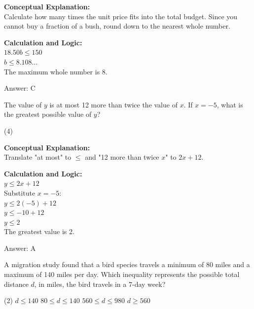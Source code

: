 \documentclass[11pt,paper=a4,answers]{exam}
\begin{document}
\begin{questions}
\begin{solution}
\textbf{Conceptual Explanation:} \\
Calculate how many times the unit price fits into the total budget. Since you cannot buy a fraction of a bush, round down to the nearest whole number.

\vspace{10pt}
\textbf{Calculation and Logic:} \\
$18.50b \le 150$ \\
$b \le 8.108...$ \\
The maximum whole number is 8.

\vspace{15pt}
Answer: \colorbox{yellow!100}{C}
\end{solution}

\vspace{20pt}

\question
The value of $y$ is at most 12 more than twice the value of $x$. If $x = -5$, what is the greatest possible value of $y$?
\begin{tasks}(4)
\end{tasks}

\begin{solution}
\textbf{Conceptual Explanation:} \\
Translate "at most" to $\le$ and "12 more than twice $x$" to $2x + 12$.

\vspace{10pt}
\textbf{Calculation and Logic:} \\
$y \le 2x + 12$ \\
Substitute $x = -5$: \\
$y \le 2(-5) + 12$ \\
$y \le -10 + 12$ \\
$y \le 2$ \\
The greatest value is 2.

\vspace{15pt}
Answer: \colorbox{yellow!100}{A}
\end{solution}

\vspace{20pt}

\question
A migration study found that a bird species travels a minimum of 80 miles and a maximum of 140 miles per day. Which inequality represents the possible total distance $d$, in miles, the bird travels in a 7-day week?
\begin{tasks}(2)
    \task $d \le 140$
    \task $80 \le d \le 140$
    \task $560 \le d \le 980$
    \task $d \ge 560$
\end{tasks}


\end{questions}
\end{document}
